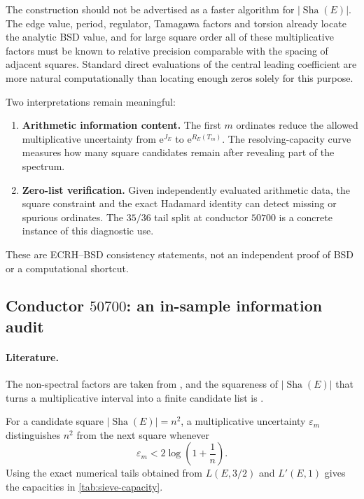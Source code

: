 \documentclass[11pt,reqno]{amsart}
\theoremstyle{remark}
\newcommand{\ShaE}{\mathop{\mathrm{Sha}}}
\newcommand{\e}{\mathrm{e}}
\begin{document}
The construction should not be advertised as a faster algorithm for $|\ShaE(E)|$.  The edge value, period, regulator, Tamagawa factors and torsion already locate the analytic BSD value, and for large square order all of these multiplicative factors must be known to relative precision comparable with the spacing of adjacent squares.  Standard direct evaluations of the central leading coefficient are more natural computationally than locating enough zeros solely for this purpose.

Two interpretations remain meaningful:
\begin{enumerate}
  \item \textbf{Arithmetic information content.}  The first $m$ ordinates reduce the allowed multiplicative uncertainty from $\e^{J_E}$ to $\e^{R_E(T_m)}$.  The resolving-capacity curve measures how many square candidates remain after revealing part of the spectrum.
  \item \textbf{Zero-list verification.}  Given independently evaluated arithmetic data, the square constraint and the exact Hadamard identity can detect missing or spurious ordinates.  The $35/36$ tail split at conductor $50700$ is a concrete instance of this diagnostic use.
\end{enumerate}
These are ECRH--BSD consistency statements, not an independent proof of BSD or a computational shortcut.

\subsection{Conductor $50700$: an in-sample information audit}

\paragraph{Literature.}
The non-spectral factors are taken from \cite{LMFDB,Cremona1997}, and the squareness of $|\ShaE(E)|$ that turns a multiplicative interval into a finite candidate list is \cite{Cassels1965,PoonenStoll1999}.

For a candidate square $|\ShaE(E)|=n^2$, a multiplicative uncertainty $\varepsilon_m$ distinguishes $n^2$ from the next square whenever
\begin{equation}
  \varepsilon_m<2\log\!\left(1+\frac1n\right).
  \label{eq:square-resolution-criterion}
\end{equation}
Using the exact numerical tails obtained from $L(E,3/2)$ and $L'(E,1)$ gives the capacities in \cref{tab:sieve-capacity}.
\end{document}
